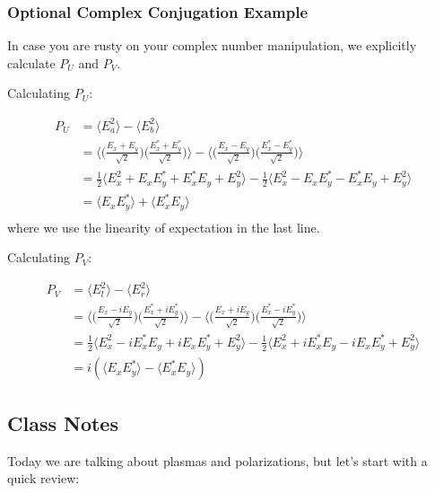 \documentclass{article}
\begin{document}
\subsubsection{Optional Complex Conjugation Example}

In case you are rusty on your complex number manipulation, we explicitly calculate $P_U$ and $P_V$.

Calculating $P_U$:

\begin{align}
    P_U &= \langle E_a^2 \rangle - \langle E_b^2 \rangle \\
    &= \Big\langle \Big(\frac{E_x + E_y}{\sqrt{2}} \Big) \Big(\frac{E_x^* + E_y^*}{\sqrt{2}}\Big) \Big\rangle - \Big\langle \Big(\frac{E_x - E_y}{\sqrt{2}} \Big) \Big( \frac{E_x^* - E_y^*}{\sqrt{2}} \Big) \Big\rangle \\
    &= \frac{1}{2} \langle E_x^2 + E_x E_y^* + E_x ^* E_y + E_y^2 \rangle - \frac{1}{2} \langle E_x^2 - E_x E_y^* - E_x ^* E_y + E_y^2 \rangle \\
    &= \langle E_x E_y^* \rangle + \langle E_x ^* E_y \rangle \\
\end{align}
where we use the linearity of expectation in the last line.

Calculating $P_V$:

\begin{align}
    P_V &= \langle E_l^2 \rangle - \langle E_r^2 \rangle \\
    &= \Big\langle \Big(\frac{E_x - iE_y}{\sqrt{2}} \Big) \Big( \frac{E_x^* + iE_y^*}{\sqrt{2}} \Big) \Big\rangle - \Big\langle \Big(\frac{E_x + iE_y}{\sqrt{2}} \Big) \Big(\frac{E_x^* - i E_y^*}{\sqrt{2}}\Big) \Big\rangle \\
    &= \frac{1}{2} \langle E_x^2 - iE_x^* E_y + iE_x E_y^* + E_y^2 \rangle - \frac{1}{2} \langle E_x^2 + iE_x^* E_y - iE_x E_y^* + E_y^2 \rangle \\
    &= i(\langle E_x E_y^* \rangle - \langle E_x^* E_y \rangle) 
\end{align}

\subsection{Class Notes}

Today we are talking about plasmas and polarizations, but let's start with a quick review:
\end{document}
